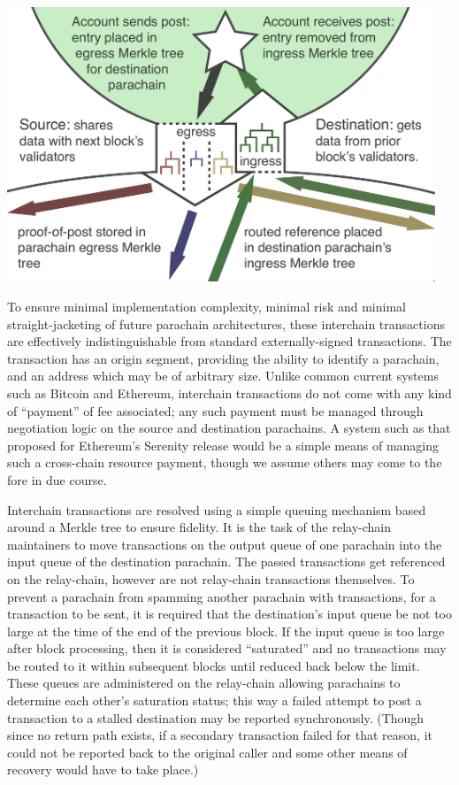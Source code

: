 \documentclass[9pt,oneside]{amsart}
\newenvironment{Figure}
  {\par\medskip\noindent\minipage{\linewidth}}
  {\endminipage\par\medskip}
\begin{document}
\begin{multicols}{2}
\begin{Figure}
\medskip
\centering
\includegraphics[width=0.96\textwidth]{Queues.pdf}
\medskip
\end{Figure}

 To ensure minimal implementation complexity, minimal risk and minimal straight-jacketing of future parachain architectures, these interchain transactions are effectively indistinguishable from standard externally-signed transactions. The transaction has an origin segment, providing the ability to identify a parachain, and an address which may be of arbitrary size. Unlike common current systems such as Bitcoin and Ethereum, interchain transactions do not come with any kind of ``payment'' of fee associated; any such payment must be managed through negotiation logic on the source and destination parachains. A system such as that proposed for Ethereum's Serenity release\cite{buterin2016serenity} would be a simple means of managing such a cross-chain resource payment, though we assume others may come to the fore in due course.

 Interchain transactions are resolved using a simple queuing mechanism based around a Merkle tree to ensure fidelity. It is the task of the relay-chain maintainers to move transactions on the output queue of one parachain into the input queue of the destination parachain. The passed transactions get referenced on the relay-chain, however are not relay-chain transactions themselves. To prevent a parachain from spamming another parachain with transactions, for a transaction to be sent, it is required that the destination's input queue be not too large at the time of the end of the previous block. If the input queue is too large after block processing, then it is considered ``saturated'' and no transactions may be routed to it within subsequent blocks until reduced back below the limit. These queues are administered on the relay-chain allowing parachains to determine each other's saturation status; this way a failed attempt to post a transaction to a stalled destination may be reported synchronously. (Though since no return path exists, if a secondary transaction failed for that reason, it could not be reported back to the original caller and some other means of recovery would have to take place.)


\end{multicols}
\end{document}
